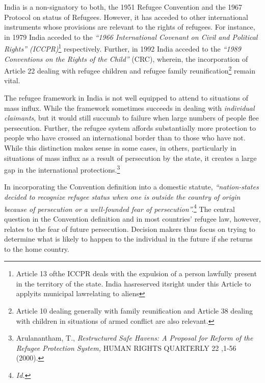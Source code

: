 \begin{multicols}{2}
\noi
India is a non-signatory to both, the 1951 Refugee Convention and the 1967 Protocol on
status of Refugees. However, it has acceded to other international instruments whose
provisions are relevant to the rights of refugees. For instance, in 1979 India acceded to the
\textit{“1966 International Covenant on Civil and Political Rights” (ICCPR)}\footnote{Article 13 ofthe ICCPR deals with the expulsion of a person lawfully present in the territory of the state. India hasreserved itsright under this Article to applyits municipal lawrelating to aliens} respectively. Further, in 1992 India acceded to the \textit{“1989 Conventions on the Rights of the Child”} (CRC), wherein, the incorporation of Article 22 dealing with refugee children and refugee family reunification\footnote{Article 10 dealing generally with family reunification and Article 38 dealing with children in situations of armed conflict are also relevant.} remain vital.

\vspace{-.15cm}


\vspace{-.1cm}

\noi
The refugee framework in India is not well equipped to attend to situations of mass influx.
While the framework sometimes succeeds in dealing with \textit{individual claimants}, but it would
still succumb to failure when large numbers of people flee persecution. Further, the refugee
system affords substantially more protection to people who have crossed an international
border than to those who have not. While this distinction makes sense in some cases, in
others, particularly in situations of mass influx as a result of persecution by the state, it creates
a large gap in the international protections.\footnote{Arulanantham, T., \textit{ Restructured Safe Havens: A Proposal for Reform of the Refugee Protection System,} HUMAN RIGHTS QUARTERLY 22 ,1-56 (2000).}

\vspace{-.1cm}

\noi
In incorporating the Convention definition into a domestic statute, \textit{“nation-states decided to
recognize refugee status when one is outside the country of origin because of persecution or a
well-founded fear of persecution”.}\footnote{\textit{Id.}} The central question in the Convention definition and in
most countries' refugee law, however, relates to the fear of future persecution. Decision
makers thus focus on trying to determine what is likely to happen to the individual in the
future if she returns to the home country.


\end{multicols}
